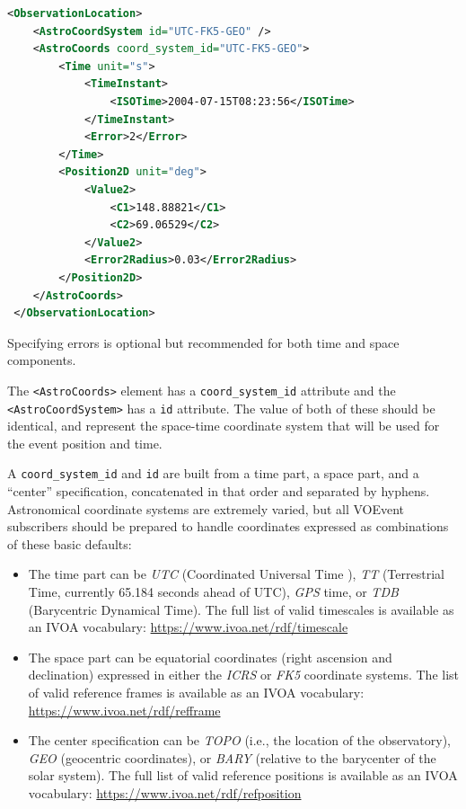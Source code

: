 \documentclass[11pt,a4paper]{ivoa}
\begin{document}
\begin{lstlisting}[language=XML]
<ObservationLocation>
    <AstroCoordSystem id="UTC-FK5-GEO" />
    <AstroCoords coord_system_id="UTC-FK5-GEO">
        <Time unit="s">
            <TimeInstant>
                <ISOTime>2004-07-15T08:23:56</ISOTime>
            </TimeInstant>
            <Error>2</Error>
        </Time>
        <Position2D unit="deg">
            <Value2>
                <C1>148.88821</C1>
                <C2>69.06529</C2>
            </Value2>
            <Error2Radius>0.03</Error2Radius>
        </Position2D>
    </AstroCoords>
 </ObservationLocation> 
\end{lstlisting}

Specifying errors is optional but recommended for both time and space 
components. 

The {\tt <AstroCoords>} element has a {\tt coord\_system\_id} attribute and the 
{\tt <AstroCoordSystem>} has a {\tt id} attribute. The value of both of these 
should be identical, and represent the space-time coordinate system that will be 
used for the event position and time. 

A {\tt coord\_system\_id} and {\tt id} are built from a time part, a space part, 
and a ``center'' specification, concatenated in that order and separated by 
hyphens. Astronomical coordinate systems are extremely varied, but all VOEvent 
subscribers should be prepared to handle coordinates expressed as combinations 
of these basic defaults: 
\begin{itemize}
\item The time part can be \emph{UTC} (Coordinated Universal Time 
\citep{bib26}), \emph{TT} (Terrestrial Time, currently 65.184 seconds ahead of 
UTC), \emph{GPS} time, or \emph{TDB} (Barycentric Dynamical Time). The full list 
of valid timescales is available as an IVOA vocabulary: 
\url{https://www.ivoa.net/rdf/timescale}
\item The space part can be equatorial coordinates (right ascension and 
declination) expressed in either the \emph{ICRS} or \emph{FK5} coordinate 
systems. The list of valid reference frames is available as an IVOA vocabulary: 
\url{https://www.ivoa.net/rdf/refframe}
\item The center specification can be \emph{TOPO} (i.e., the location of the 
observatory), \emph{GEO} (geocentric coordinates), or \emph{BARY} (relative to 
the barycenter of the solar system). The full list of valid reference positions
is available as an IVOA vocabulary: \url{https://www.ivoa.net/rdf/refposition}
\end{itemize}
\end{document}
